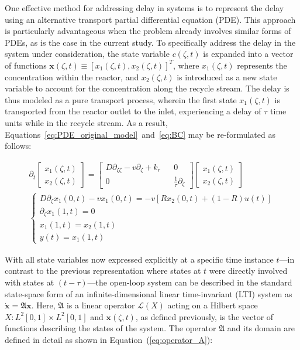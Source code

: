 One effective method for addressing delay in systems is to represent the delay using an alternative transport partial differential equation (PDE). This approach is particularly advantageous when the problem already involves similar forms of PDEs, as is the case in the current study. To specifically address the delay in the system under consideration, the state variable $c(\zeta, t)$ is expanded into a vector of functions $\bm{x}(\zeta, t) \equiv [x_1(\zeta, t), x_2(\zeta, t)]^T$, where $x_1(\zeta, t)$ represents the concentration within the reactor, and $x_2(\zeta, t)$ is introduced as a new state variable to account for the concentration along the recycle stream. The delay is thus modeled as a pure transport process, wherein the first state $x_1(\zeta, t)$ is transported from the reactor outlet to the inlet, experiencing a delay of $\tau$ time units while in the recycle stream. As a result, Equations~\ref{eq:PDE_original_model}~and~\ref{eq:BC} may be re-formulated as follows:

\begin{align}
    \partial_t 
    \begin{bmatrix}
        x_1(\zeta, t) \\ x_2(\zeta,t)
    \end{bmatrix}
    =
    \begin{bmatrix}
        D \partial_{\zeta \zeta} - v \partial_\zeta + k_r && 0 \\
        0 && \frac{1}{\tau} \partial_\zeta
    \end{bmatrix}
    \begin{bmatrix}
        x_1(\zeta, t) \\ x_2(\zeta,t)
    \end{bmatrix}\\
\begin{cases}
    D \partial_\zeta x_1(0, t) - v x_1(0, t) = -v \left[ R x_2(0, t) + (1-R) u(t) \right] \\
    \partial_\zeta x_1(1, t) = 0 \\
    x_1(1,t) = x_2(1,t) \\
    y(t) = x_1(1, t)
\end{cases}
\end{align}

With all state variables now expressed explicitly at a specific time instance $t$—in contrast to the previous representation where states at $t$ were directly involved with states at $(t-\tau)$—the open-loop system can be described in the standard state-space form of an infinite-dimensional linear time-invariant (LTI) system as $\dot{\bm{x}} = \mathfrak{A} \bm{x}$. Here, $\mathfrak{A}$ is a linear operator $\mathcal{L}(X)$ acting on a Hilbert space $X: L^2[0,1] \times L^2[0,1]$ and $\bm{x}(\zeta,t)$, as defined previously, is the vector of functions describing the states of the system. The operator $\mathfrak{A}$ and its domain are defined in detail as shown in Equation~(\ref{eq:operator_A}):

